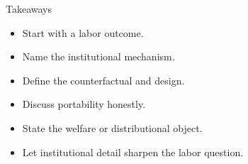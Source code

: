 \documentclass[aspectratio=169,11pt]{beamer}
\begin{document}
\begin{frame}{Takeaways}
\begin{itemize}
    \item Start with a labor outcome.
    \item Name the institutional mechanism.
    \item Define the counterfactual and design.
    \item Discuss portability honestly.
    \item State the welfare or distributional object.
    \item Let institutional detail sharpen the labor question.
\end{itemize}
\end{frame}
\end{document}
